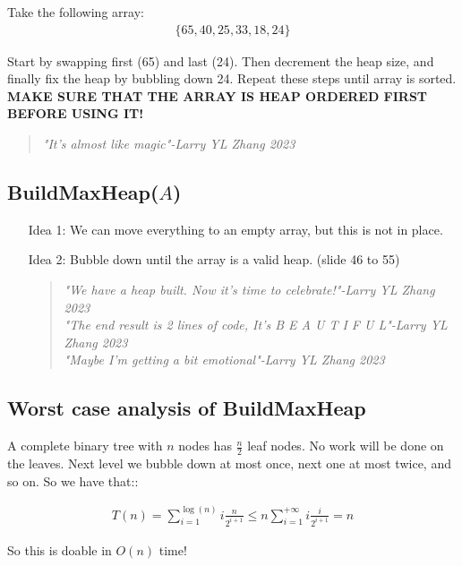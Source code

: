 \documentclass[12pt]{article}
\begin{document}
Take the following array:
\begin{align*}
    \{65,40,25,33,18,24\}
\end{align*}

Start by swapping first (65) and last (24). Then decrement the heap size, and finally fix the heap by bubbling down 24. Repeat these steps until array is sorted.
\textbf{MAKE SURE THAT THE ARRAY IS HEAP ORDERED FIRST BEFORE USING IT!}
\begin{quote}
    \textit{"It's almost like magic"-Larry YL Zhang 2023}
\end{quote}

\subsection*{BuildMaxHeap($A$)}
\begin{itemize}
    \item[Idea 1:] We can move everything to an empty array, but this is not in place.
    \item[Idea 2:] Bubble down until the array is a valid heap. (slide 46 to 55)
    \begin{quote}
        \textit{"We have a heap built. Now it's time to celebrate!"-Larry YL Zhang 2023}\\
        \textit{"The end result is 2 lines of code, It's B E A U T I F U L"-Larry YL Zhang 2023}\\
        \textit{"Maybe I'm getting a bit emotional"-Larry YL Zhang 2023}
    \end{quote}
    \item[] 
\end{itemize}

\subsection*{Worst case analysis of BuildMaxHeap}
A complete binary tree with $n$ nodes has $\frac{n}{2}$ leaf nodes. No work will be done on the leaves. Next level we bubble down at most once, next one at most twice, and so on. So we have that::

\begin{align*}
    T(n)=\sum_{i=1}^{\log(n)} i\frac{n}{2^{i+1}} \leq n\sum_{i=1}^{+\infty} i\frac{i}{2^{i+1}}=n
\end{align*}

So this is doable in $O(n)$ time!
\end{document}
